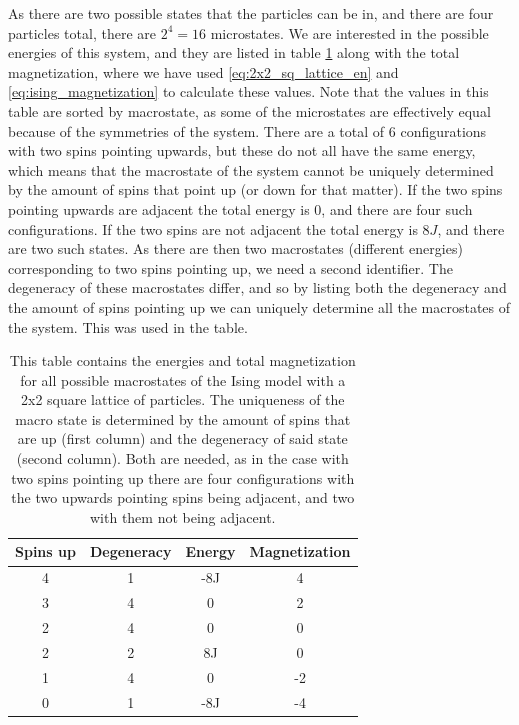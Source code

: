 \documentclass[reprint,english,notitlepage]{revtex4-1}  %
\begin{document}
As there are two possible states that the particles can be in, and there are four particles total, there are $2^4 = 16$ microstates. We are interested in the possible energies of this system, and they are listed in table \ref{table:2x2_sq_lattice_en_and_mag} along with the total magnetization, where we have used \eqref{eq:2x2_sq_lattice_en} and \eqref{eq:ising_magnetization} to calculate these values. Note that the values in this table are sorted by macrostate, as some of the microstates are effectively equal because of the symmetries of the system. There are a total of 6 configurations with two spins pointing upwards, but these do not all have the same energy, which means that the macrostate of the system cannot be uniquely determined by the amount of spins that point up (or down for that matter). If the two spins pointing upwards are adjacent the total energy is 0, and there are four such configurations. If the two spins are not adjacent the total energy is $8J$, and there are two such states. As there are then two macrostates (different energies) corresponding to two spins pointing up, we need a second identifier. The degeneracy of these macrostates differ, and so by listing both the degeneracy and the amount of spins pointing up we can uniquely determine all the macrostates of the system. This was used in the table.

\begin{table}[H]
\centering
\caption{This table contains the energies and total magnetization for all possible macrostates of the Ising model with a 2x2 square lattice of particles. The uniqueness of the macro state is determined by the amount of spins that are up (first column) and the degeneracy of said state (second column). Both are needed, as in the case with two spins pointing up there are four configurations with the two upwards pointing spins being adjacent, and two with them not being adjacent.} \label{table:2x2_sq_lattice_en_and_mag}
\begin{tabular}{|c|c|c|c|}
\hline
Spins up & Degeneracy & Energy & Magnetization \\
\hline
4 & 1 & -8J & 4 \\
3 & 4 & 0 & 2 \\
2 & 4 & 0 & 0 \\
2 & 2 & 8J & 0 \\
1 & 4 & 0 & -2 \\
0 & 1 & -8J & -4 \\
\hline
\end{tabular}
\end{table}
\end{document}
